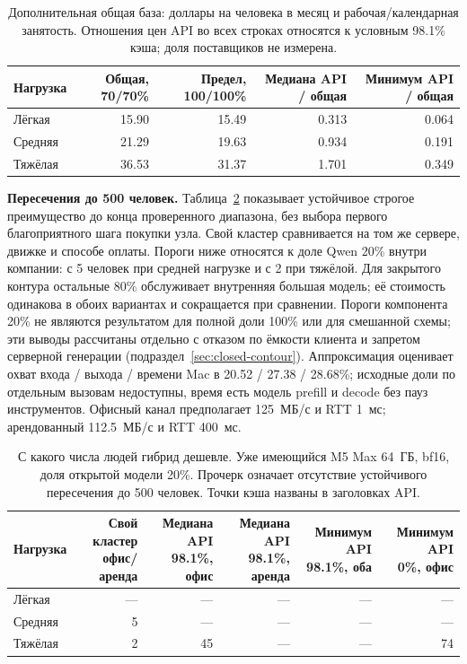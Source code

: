 \begin{table}[t]
\centering
\caption{Дополнительная общая база: доллары на человека в месяц и рабочая/календарная занятость.
Отношения цен API во всех строках относятся к условным 98.1\% кэша; доля поставщиков не измерена.}
\label{tab:r22-shared}
\footnotesize
\begin{tabular}{lrrrr}
\toprule
Нагрузка & Общая, 70/70\% & Предел, 100/100\% & Медиана API / общая & Минимум API / общая \\
\midrule
Лёгкая & 15.90 & 15.49 & 0.313 & 0.064 \\
Средняя & 21.29 & 19.63 & 0.934 & 0.191 \\
Тяжёлая & 36.53 & 31.37 & 1.701 & 0.349 \\
\bottomrule
\end{tabular}
\end{table}

\textbf{Пересечения до 500 человек.} Таблица~\ref{tab:r22-crossings} показывает устойчивое строгое преимущество
до конца проверенного диапазона, без выбора первого благоприятного шага покупки узла.
Свой кластер сравнивается на том же сервере, движке и способе оплаты.
Пороги ниже относятся к доле Qwen 20\% внутри компании: с 5 человек при средней нагрузке и с 2 при тяжёлой.
Для закрытого контура остальные 80\% обслуживает внутренняя большая модель;
её стоимость одинакова в обоих вариантах и сокращается при сравнении.
Пороги компонента 20\% не являются результатом для полной доли 100\% или для смешанной схемы;
эти выводы рассчитаны отдельно с отказом по ёмкости клиента и запретом серверной генерации
(подраздел~\ref{sec:closed-contour}).
Аппроксимация оценивает охват входа / выхода / времени Mac в 20.52 / 27.38 / 28.68\%;
исходные доли по отдельным вызовам недоступны, время есть модель prefill и decode без пауз инструментов.
Офисный канал предполагает 125~МБ/с и RTT 1~мс; арендованный 112.5~МБ/с и RTT 400~мс.

\begin{table}[t]
\centering
\caption{С какого числа людей гибрид дешевле. Уже имеющийся M5 Max 64~ГБ, bf16, доля открытой модели 20\%.
Прочерк означает отсутствие устойчивого пересечения до 500 человек. Точки кэша названы в заголовках API.}
\label{tab:r22-crossings}
\footnotesize
\begin{tabular}{lrrrrr}
\toprule
Нагрузка & \shortstack{Свой кластер\\офис/аренда} & \shortstack{Медиана API\\98.1\%, офис} & \shortstack{Медиана API\\98.1\%, аренда} & \shortstack{Минимум API\\98.1\%, оба} & \shortstack{Минимум API\\0\%, офис} \\
\midrule
Лёгкая & --- & --- & --- & --- & --- \\
Средняя & 5 & --- & --- & --- & --- \\
Тяжёлая & 2 & 45 & --- & --- & 74 \\
\bottomrule
\end{tabular}
\end{table}

